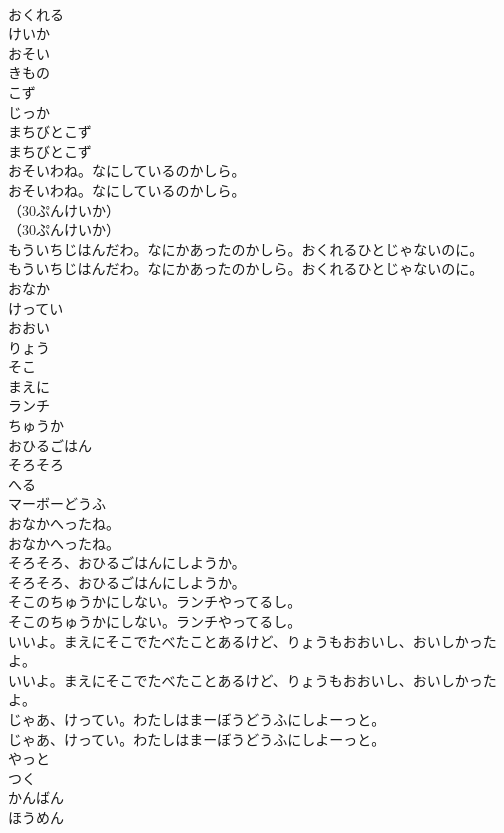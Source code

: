 \documentclass[8pt]{extreport}
\begin{document}
\begin{CJK}{UTF8}{min}
\\	おくれる
\\	けいか
\\	おそい
\\	きもの
\\	こず
\\	じっか
\\	まちびとこず
\\	まちびとこず
\\	おそいわね。なにしているのかしら。
\\	おそいわね。なにしているのかしら。
\\	（30ぷんけいか）
\\	（30ぷんけいか）
\\	もういちじはんだわ。なにかあったのかしら。おくれるひとじゃないのに。
\\	もういちじはんだわ。なにかあったのかしら。おくれるひとじゃないのに。
\\	おなか
\\	けってい
\\	おおい
\\	りょう
\\	そこ
\\	まえに
\\	ランチ
\\	ちゅうか
\\	おひるごはん
\\	そろそろ
\\	へる
\\	マーボーどうふ
\\	おなかへったね。
\\	おなかへったね。
\\	そろそろ、おひるごはんにしようか。
\\	そろそろ、おひるごはんにしようか。
\\	そこのちゅうかにしない。ランチやってるし。
\\	そこのちゅうかにしない。ランチやってるし。
\\	いいよ。まえにそこでたべたことあるけど、りょうもおおいし、おいしかったよ。
\\	いいよ。まえにそこでたべたことあるけど、りょうもおおいし、おいしかったよ。
\\	じゃあ、けってい。わたしはまーぼうどうふにしよーっと。
\\	じゃあ、けってい。わたしはまーぼうどうふにしよーっと。
\\	やっと
\\	つく
\\	かんばん
\\	ほうめん

\end{CJK}
\end{document}

